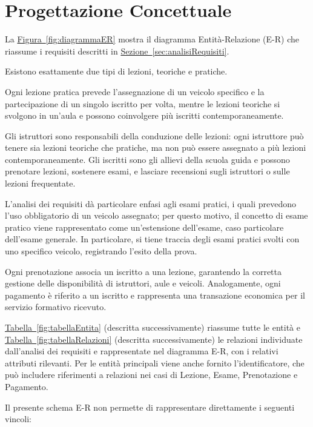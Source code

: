 \documentclass[10pt,twoside]{article}
\begin{document}
\section{Progettazione Concettuale}{
    \label{sec:progettazioneConcettuale}
    La \hyperref[fig:diagrammaER]{Figura~\ref*{fig:diagrammaER}} mostra il diagramma Entità-Relazione (E-R) che riassume i requisiti descritti in \hyperref[sec:analisiRequisiti]{Sezione~\ref*{sec:analisiRequisiti}}.
    
    Esistono esattamente due tipi di lezioni, teoriche e pratiche.

    Ogni lezione pratica prevede l'assegnazione di un veicolo specifico e la partecipazione di un singolo iscritto per volta, mentre le lezioni teoriche si svolgono in un'aula e possono coinvolgere più iscritti contemporaneamente.

    Gli istruttori sono responsabili della conduzione delle lezioni: ogni istruttore può tenere sia lezioni teoriche che pratiche, ma non può essere assegnato a più lezioni contemporaneamente.
    Gli iscritti sono gli allievi della scuola guida e possono prenotare lezioni, sostenere esami, e lasciare recensioni sugli istruttori o sulle lezioni frequentate.

    L’analisi dei requisiti dà particolare enfasi agli esami pratici, i quali prevedono l’uso obbligatorio di un veicolo assegnato; per questo motivo, il concetto di esame pratico viene rappresentato come un'estensione dell'esame, caso particolare dell'esame generale.
    In particolare, si tiene traccia degli esami pratici svolti con uno specifico veicolo, registrando l’esito della prova.

    Ogni prenotazione associa un iscritto a una lezione, garantendo la corretta gestione delle disponibilità di istruttori, aule e veicoli.
    Analogamente, ogni pagamento è riferito a un iscritto e rappresenta una transazione economica per il servizio formativo ricevuto.

    \hyperref[fig:tabellaEntita]{Tabella~\ref*{fig:tabellaEntita}} (descritta successivamente) riassume tutte le entità e \hyperref[fig:tabellaRelazioni]{Tabella~\ref*{fig:tabellaRelazioni}} (descritta successivamente) le relazioni individuate dall'analisi dei requisiti e rappresentate nel diagramma E-R, con i relativi attributi rilevanti.
    Per le entità principali viene anche fornito l'identificatore, che può includere riferimenti a relazioni nei casi di Lezione, Esame, Prenotazione e Pagamento.

    Il presente schema E-R non permette di rappresentare direttamente i seguenti vincoli:

}
\end{document}
